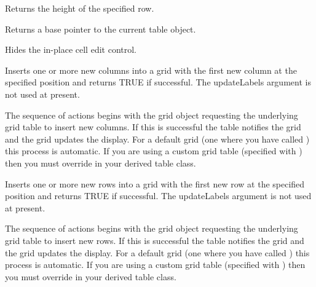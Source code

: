 \label{wxgridgetrowsize}


Returns the height of the specified row.

\label{wxgridgettable}


Returns a base pointer to the current table object.

\label{wxgridhidecelleditcontrol}


Hides the in-place cell edit control.

\label{wxgridinsertcols}


Inserts one or more new columns into a grid with the first new column at the
specified position and returns TRUE if successful. The updateLabels argument is not
used at present. 

The sequence of actions begins with the grid object requesting the underlying grid
table to insert new columns. If this is successful the table notifies the grid and the
grid updates the display. For a default grid (one where you have called 
) this process is automatic. If you are
using a custom grid table (specified with ) 
then you must override 
 in your derived
table class.

\label{wxgridinsertrows}


Inserts one or more new rows into a grid with the first new row at the specified
position and returns TRUE if successful. The updateLabels argument is not used at
present. 

The sequence of actions begins with the grid object requesting the underlying grid
table to insert new rows. If this is successful the table notifies the grid and the
grid updates the display. For a default grid (one where you have called 
) this process is automatic. If you are
using a custom grid table (specified with ) 
then you must override 
 in your derived
table class.

